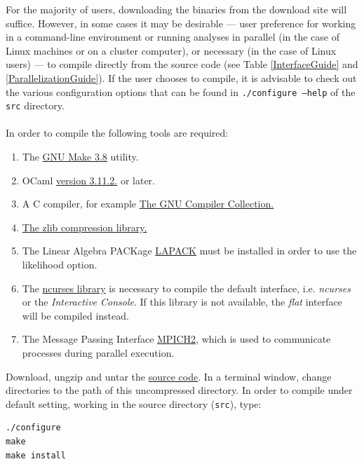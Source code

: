 For the majority of users, downloading the binaries from the \poy download site will suffice.  However, in 
some cases it may be %
desirable --- user preference for working in a command-line environment or running \poy analyses in parallel 
(in the case of Linux machines or on a cluster computer), or necessary (in the case of Linux users) --- to compile 
\poy directly from the source code (see Table \ref{InterfaceGuide} and \ref{ParallelizationGuide}). 
If the user chooses to compile, it is advisable to check out the various configuration 
options that can be found in {\tt ./configure --help} of the \texttt {src} directory. \\
\\
In order to compile \poy the following tools are required:

\begin{enumerate}
\item The \href{http://www.gnu.org/software/make/}{GNU Make 3.8} utility. 
\item OCaml \href{http://www.ocaml.org}{version 3.11.2.} or later. 
\item A C compiler, for example \href{http://gcc.gnu.org/} {The GNU Compiler Collection.}
\item \href{http://www.zlib.net}{The zlib compression library.}
\item The Linear Algebra PACKage \href {http://www.netlib.org/lapack/}{LAPACK} must be installed in order to 
use the likelihood option.
\item The \href{http://www.gnu.org/s/ncurses} {ncurses library} is necessary to compile the default interface, 
i.e. \emph{ncurses} or the \emph{Interactive Console}. If this library is not available, the \emph{flat} interface will be 
compiled instead.
\item The Message Passing Interface \href{http://www-unix.mcs.anl.gov/mpi/}{MPICH2}, which is used to communicate 
processes during parallel execution.
\end{enumerate}
Download, ungzip and untar the \href{http://research.amnh.org/scicomp/projects/poy.php}{\poy source code}.  
In a terminal window, change directories to the path of this uncompressed directory.  
In order to compile under default setting, working in the source directory (\texttt{src}), type:
\begin{verbatim}
./configure
make
make install
\end{verbatim}

